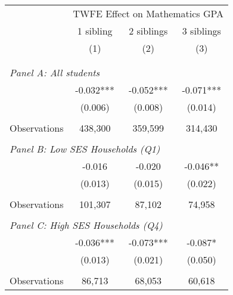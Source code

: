 \makeatletter
{}
{
\makeatother
\begin{tabular}{lccc}
\toprule
\cmidrule(lr){2-4}
& \multicolumn{3}{c}{TWFE Effect on Mathematics GPA} \\
\cmidrule(lr){2-4}
& 1 sibling & 2 siblings & 3 siblings  \\
\cmidrule(lr){2-2} \cmidrule(lr){3-3} \cmidrule(lr){4-4}
& (1) & (2) & (3)\\
\bottomrule
&  &  &  \\
&  &  &   \\
\multicolumn{4}{l}{\textit{Panel A: All students}} \\
\hspace{3mm}        &      -0.032***&      -0.052***&      -0.071***\\
                    &     (0.006)   &     (0.008)   &     (0.014)   \\
                    &               &               &               \\
\hspace{3mm}Observations&     438,300   &     359,599   &     314,430   \\
 
&  &  &   \\
\multicolumn{4}{l}{\textit{Panel B: Low SES Households (Q1)}} \\
\hspace{3mm}        &      -0.016   &      -0.020   &      -0.046** \\
                    &     (0.013)   &     (0.015)   &     (0.022)   \\
                    &               &               &               \\
\hspace{3mm}Observations&     101,307   &      87,102   &      74,958   \\
 
&  &  &   \\
\multicolumn{4}{l}{\textit{Panel C: High SES Households (Q4)}} \\
\hspace{3mm}        &      -0.036***&      -0.073***&      -0.087*  \\
                    &     (0.013)   &     (0.021)   &     (0.050)   \\
                    &               &               &               \\
\hspace{3mm}Observations&      86,713   &      68,053   &      60,618   \\
 

\end{tabular}}
